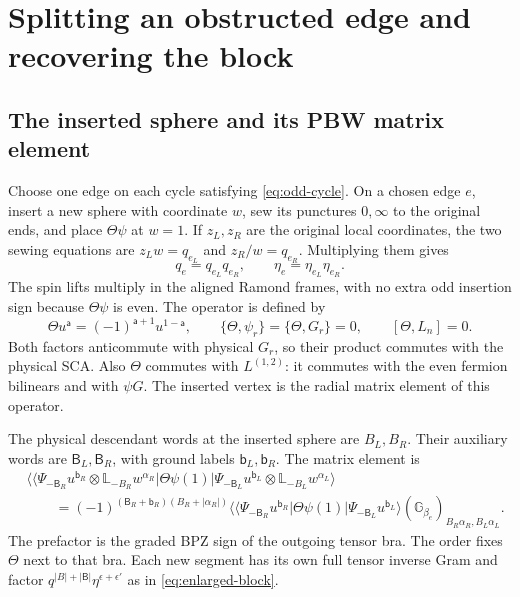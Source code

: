\documentclass[11pt]{article}
\numberwithin{equation}{section}
\begin{document}
\section{Splitting an obstructed edge and recovering the block}

\subsection{The inserted sphere and its PBW matrix element}

Choose one edge on each cycle satisfying \eqref{eq:odd-cycle}. On a chosen
edge $e$, insert a new sphere with coordinate $w$, sew its punctures
$0,\infty$ to the original ends, and place $\Theta\psi$ at $w=1$.
If $z_L,z_R$ are the original local coordinates, the two sewing equations
are $z_Lw=q_{e_L}$ and $z_R/w=q_{e_R}$. Multiplying them gives
\begin{equation}
 q_e=q_{e_L}q_{e_R},\qquad \eta_e=\eta_{e_L}\eta_{e_R}.
 \label{eq:split-map}
\end{equation}
The spin lifts multiply in the aligned Ramond frames, with no extra odd
insertion sign because $\Theta\psi$ is even. The operator is defined by
\begin{equation}
 \Theta u^{\mathsf a}=(-1)^{\mathsf a+1}u^{1-\mathsf a},
 \qquad\{\Theta,\psi_r\}=\{\Theta,G_r\}=0,
 \qquad[\Theta,L_n]=0.
 \label{eq:theta}
\end{equation}
Both factors anticommute with physical $G_r$, so their product commutes
with the physical SCA. Also $\Theta$ commutes with $L^{(1,2)}$:
it commutes with the even fermion bilinears and with $\psi G$.
The inserted vertex is the radial matrix element of this operator.

The physical descendant words at the inserted sphere are $B_L,B_R$.
Their auxiliary words are $\mathsf B_L,\mathsf B_R$, with ground labels
$\mathsf b_L,\mathsf b_R$. The matrix element is
\begin{align}
 &\Big\langle\!\Big\langle
 \Psi_{-\mathsf B_R}u^{\mathsf b_R}\otimes\mathbb L_{-B_R}w^{\alpha_R}
 \Big|\Theta\psi(1)\Big|
 \Psi_{-\mathsf B_L}u^{\mathsf b_L}\otimes\mathbb L_{-B_L}w^{\alpha_L}
 \Big\rangle
 \nonumber\\
 &\qquad=(-1)^{(\mathsf B_R+\mathsf b_R)(B_R+|\alpha_R|)}
        \langle\!\langle\Psi_{-\mathsf B_R}u^{\mathsf b_R}|
                 \Theta\psi(1)|\Psi_{-\mathsf B_L}u^{\mathsf b_L}\rangle
                (\mathbb G_{\beta_e})_{B_R\alpha_R,B_L\alpha_L}.
 \label{eq:split-pbw}
\end{align}
The prefactor is the graded BPZ sign of the outgoing tensor bra.
The order fixes $\Theta$ next to that bra. Each new segment has
its own full tensor inverse Gram and factor
$q^{|B|+|\mathsf B|}\eta^{\epsilon+\epsilon'}$ as in
\eqref{eq:enlarged-block}.
\end{document}
